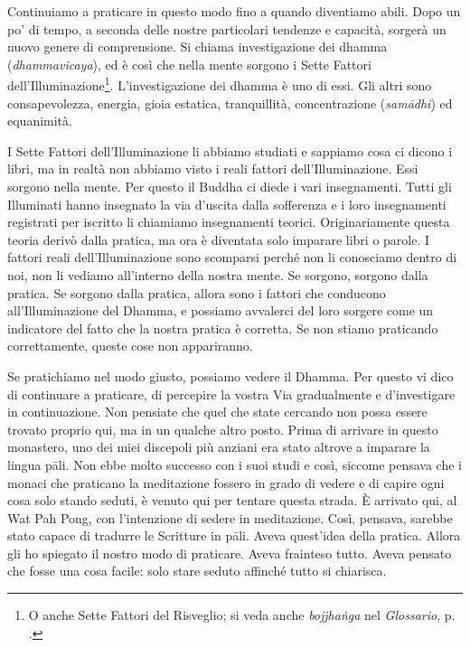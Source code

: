 Continuiamo a praticare in questo modo fino a quando diventiamo abili.
Dopo un po' di tempo, a seconda delle nostre particolari tendenze e
capacità, sorgerà un nuovo genere di comprensione. Si chiama
investigazione dei dhamma (\emph{dhammavicaya}), ed è così che
nella mente sorgono i Sette Fattori dell'Illuminazione\footnote{O anche
  Sette Fattori del Risveglio; si veda anche \emph{bojjhaṅga} nel
  \emph{Glossario}, p. \pageref{glossary-bojjhanga}.}. L'investigazione dei dhamma è uno di essi.
Gli altri sono consapevolezza, energia, gioia estatica, tranquillità,
concentrazione (\emph{samādhi}) ed equanimità.

I Sette Fattori dell'Illuminazione li abbiamo studiati e sappiamo cosa
ci dicono i libri, ma in realtà non abbiamo visto i reali fattori
dell'Illuminazione. Essi sorgono nella mente. Per questo il Buddha ci
diede i vari insegnamenti. Tutti gli Illuminati hanno insegnato la via
d'uscita dalla sofferenza e i loro insegnamenti registrati per iscritto
li chiamiamo insegnamenti teorici. Originariamente questa teoria derivò
dalla pratica, ma ora è diventata solo imparare libri o parole. I
fattori reali dell'Illuminazione sono scomparsi perché non li conosciamo
dentro di noi, non li vediamo all'interno della nostra mente. Se
sorgono, sorgono dalla pratica. Se sorgono dalla pratica, allora sono i
fattori che conducono all'Illuminazione del Dhamma, e possiamo avvalerci
del loro sorgere come un indicatore del fatto che la nostra pratica è
corretta. Se non stiamo praticando correttamente, queste cose non
appariranno.

Se pratichiamo nel modo giusto, possiamo vedere il Dhamma. Per questo vi
dico di continuare a praticare, di percepire la vostra Via gradualmente
e d'investigare in continuazione. Non pensiate che quel che state
cercando non possa essere trovato proprio qui, ma in un qualche altro
posto. Prima di arrivare in questo monastero, uno dei miei discepoli più
anziani era stato altrove a imparare la lingua pāli. Non ebbe molto
successo con i suoi studi e così, siccome pensava che i monaci che
praticano la meditazione fossero in grado di vedere e di capire ogni
cosa solo stando seduti, è venuto qui per tentare questa strada. È
arrivato qui, al Wat Pah Pong, con l'intenzione di sedere in
meditazione. Così, pensava, sarebbe stato capace di tradurre le
Scritture in pāli. Aveva quest'idea della pratica. Allora gli ho
spiegato il nostro modo di praticare. Aveva frainteso tutto. Aveva
pensato che fosse una cosa facile: solo stare seduto affinché tutto si
chiarisca.

